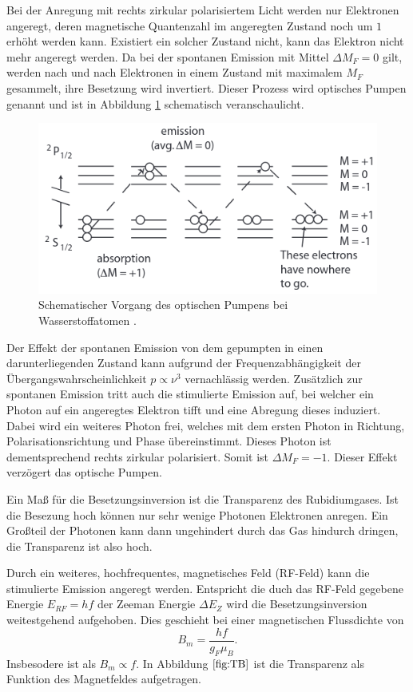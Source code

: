 \noindent
Bei der Anregung mit rechts zirkular polarisiertem Licht werden nur 
Elektronen angeregt, deren magnetische Quantenzahl im angeregten 
Zustand noch um $\num{1}$ erhöht werden kann. Existiert ein solcher
Zustand nicht, kann das Elektron nicht mehr angeregt werden. Da bei 
der spontanen Emission mit Mittel $\Delta M_F=0$ gilt, werden nach und nach 
Elektronen in einem Zustand mit maximalem $M_F$ gesammelt, ihre 
Besetzung wird invertiert. Dieser Prozess wird optisches Pumpen 
genannt und ist in Abbildung \ref{fig:pumpen} schematisch 
veranschaulicht.
\begin{figure}[H]
    \centering
    \includegraphics[scale= 0.5]{pictures/pumpen.png}
    \caption{Schematischer Vorgang des optischen Pumpens bei Wasserstoffatomen \cite{OpticalPumping}.}
    \label{fig:pumpen}
\end{figure}
\noindent
Der Effekt der spontanen Emission von dem gepumpten in einen 
darunterliegenden Zustand kann aufgrund der Frequenzabhängigkeit 
der Übergangswahrscheinlichkeit $p\propto\nu^3$ vernachlässig werden.
Zusätzlich zur spontanen Emission tritt auch die stimulierte Emission
auf, bei welcher ein Photon auf ein angeregtes Elektron tifft und 
eine Abregung dieses induziert. Dabei wird ein weiteres Photon 
frei, welches mit dem ersten Photon in Richtung, Polarisationsrichtung
und Phase übereinstimmt. Dieses Photon ist dementsprechend rechts zirkular
polarisiert. Somit ist $\Delta M_F=-1$. Dieser Effekt verzögert das 
optische Pumpen.

\noindent
Ein Maß für die Besetzungsinversion ist die Transparenz des 
Rubidiumgases. Ist die Besezung hoch können nur sehr wenige Photonen
Elektronen anregen. Ein Großteil der Photonen kann dann ungehindert
durch das Gas hindurch dringen, die Transparenz ist also hoch. 

\noindent
Durch ein weiteres, hochfrequentes, magnetisches Feld (RF-Feld) kann
die stimulierte Emission angeregt werden. Entspricht die duch das
RF-Feld gegebene Energie $E_{RF}=hf$ der Zeeman Energie $\Delta E_Z$
wird die Besetzungsinversion weitestgehend aufgehoben. Dies geschieht
bei einer magnetischen Flussdichte von
\begin{equation}
    B_m=\frac{hf}{g_F\mu_B} .
    \label{eqn:bf}
\end{equation}
Insbesodere ist als $B_m\propto f$. In Abbildung $\ref{fig:TB}$ ist 
die Transparenz als Funktion des Magnetfeldes aufgetragen.

